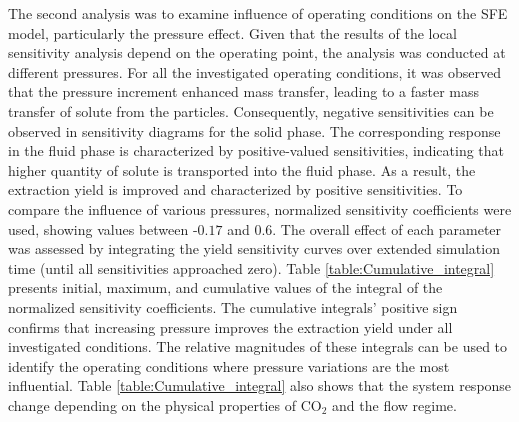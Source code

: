 \documentclass[a4paper,fleqn]{cas-dc}
\begin{document}
	The second analysis was to examine influence of operating conditions on the SFE model, particularly the pressure effect. Given that the results of the local sensitivity analysis depend on the operating point, the analysis was conducted at different pressures. For all the investigated operating conditions, it was observed that the pressure increment enhanced mass transfer, leading to a faster mass transfer of solute from the particles. Consequently, negative sensitivities can be observed in sensitivity diagrams for the solid phase. The corresponding response in the fluid phase is characterized by positive-valued sensitivities, indicating that higher quantity of solute is transported into the fluid phase. As a result, the extraction yield is improved and characterized by positive sensitivities. To compare the influence of various pressures, normalized sensitivity coefficients were used, showing values between -$0.17$ and $0.6$. The overall effect of each parameter was assessed by integrating the yield sensitivity curves over extended simulation time (until all sensitivities approached zero). Table \ref{table:Cumulative_integral} presents initial, maximum, and cumulative values of the integral of the normalized sensitivity coefficients. The cumulative integrals' positive sign confirms that increasing pressure improves the extraction yield under all investigated conditions. The relative magnitudes of these integrals can be used to identify the operating conditions where pressure variations are the most influential. Table \ref{table:Cumulative_integral} also shows that the system response change depending on the physical properties of CO$_2$ and the flow regime. 
	
	\begin{table}[h!]
		\caption{Values of the cumulative integral of the yield sensitivity.}
		\label{table:Cumulative_integral}
	\end{table}
	
\end{document}
